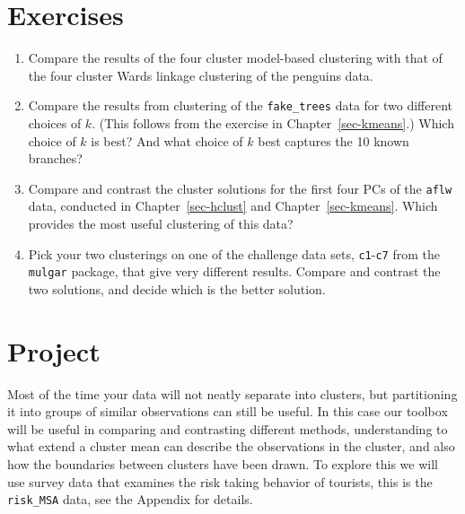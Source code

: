 \documentclass[
  letterpaper,
]{krantz}
\providecommand{\tightlist}{%
  \setlength{\itemsep}{0pt}\setlength{\parskip}{0pt}}\usepackage{longtable,booktabs,array}
\begin{document}
\section*{Exercises}\label{exercises-11}


\begin{enumerate}
\def\labelenumi{\arabic{enumi}.}
\tightlist
\item
  Compare the results of the four cluster model-based clustering with
  that of the four cluster Wards linkage clustering of the penguins
  data.
\item
  Compare the results from clustering of the \texttt{fake\_trees} data
  for two different choices of \(k\). (This follows from the exercise in
  Chapter~\ref{sec-kmeans}.) Which choice of \(k\) is best? And what
  choice of \(k\) best captures the 10 known branches?
\item
  Compare and contrast the cluster solutions for the first four PCs of
  the \texttt{aflw} data, conducted in Chapter~\ref{sec-hclust} and
  Chapter~\ref{sec-kmeans}. Which provides the most useful clustering of
  this data?
\item
  Pick your two clusterings on one of the challenge data sets,
  \texttt{c1}-\texttt{c7} from the \texttt{mulgar} package, that give
  very different results. Compare and contrast the two solutions, and
  decide which is the better solution.
\end{enumerate}

\section*{Project}\label{project-4}


Most of the time your data will not neatly separate into clusters, but
partitioning it into groups of similar observations can still be useful.
In this case our toolbox will be useful in comparing and contrasting
different methods, understanding to what extend a cluster mean can
describe the observations in the cluster, and also how the boundaries
between clusters have been drawn. To explore this we will use survey
data that examines the risk taking behavior of tourists, this is the
\texttt{risk\_MSA} data, see the Appendix for details.
\end{document}
